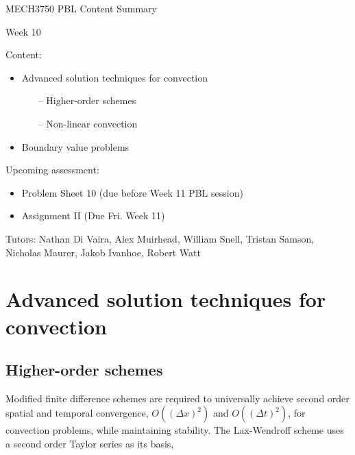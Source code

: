 \documentclass[12pt]{article}
\begin{document}
\begin{center}
{\Huge   MECH3750 PBL Content Summary}

\vspace{6mm}

{\Huge  Week 10}

\end{center}

\vspace{6mm}

{\Large Content:}
{\begin{itemize}
	\item Advanced solution techniques for convection
	\begin{itemize}
		\item[--] Higher-order schemes
		\item[--] Non-linear convection
	\end{itemize}
	\item Boundary value problems
\end{itemize}}

\vspace{4mm}

{\Large Upcoming assessment:}
{\begin{itemize}
	\item Problem Sheet 10 (due before Week 11 PBL session)
	\item Assignment II (Due Fri. Week 11)
\end{itemize}}

\vspace{4mm}

{Tutors: Nathan Di Vaira, Alex Muirhead, William Snell, Tristan Samson, Nicholas Maurer, Jakob Ivanhoe, Robert Watt}


\pagebreak

\section{Advanced solution techniques for convection}
 
\subsection{Higher-order schemes}

Modified finite difference schemes are required to universally achieve second order spatial and temporal convergence, $O((\Delta x)^2)$ and $O((\Delta t)^2)$, for convection problems, while maintaining stability. The Lax-Wendroff scheme uses a second order Taylor series as its basis,
\end{document}
